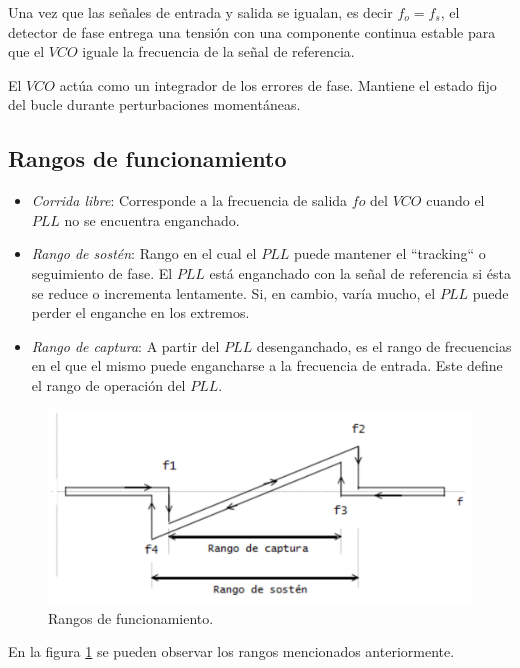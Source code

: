 \documentclass[twocolumn]{article}
\begin{document}
\begin{itemize}
Una vez que las señales de entrada y salida se igualan, es decir $f_o = f_s$, el detector de fase entrega una tensión con una componente continua estable para que el $VCO$ iguale la frecuencia de la señal de referencia.

El $VCO$ actúa como un integrador de los errores de fase. Mantiene el estado fijo del bucle durante perturbaciones momentáneas.
\end{itemize}

\subsection{Rangos de funcionamiento}
\begin{itemize}
	\item \textit{Corrida libre}: Corresponde a la frecuencia de salida $fo$ del $VCO$ cuando el $PLL$ no se encuentra enganchado.
	\item \textit{Rango de sostén}: Rango en el cual el $PLL$ puede mantener el ``tracking`` o seguimiento de fase. El $PLL$ está enganchado con la señal de referencia si ésta se reduce o incrementa lentamente. Si, en cambio, varía mucho, el $PLL$ puede perder el enganche en los extremos.

	\item \textit{Rango de captura}: A partir del $PLL$ desenganchado, es el rango de frecuencias en el que el mismo puede engancharse a la frecuencia de entrada. Este define el rango de operación del $PLL$.
\end{itemize}

\begin{figure}[H]
  \centering    
  \includegraphics[width=\columnwidth]{imagenes/fig0.jpg}
	\caption{Rangos de funcionamiento.}\label{fig:fig0}
\end{figure}

En la figura \textcolor{blue}{{\ref{fig:fig0}}} se pueden observar los rangos mencionados anteriormente.
\end{document}

